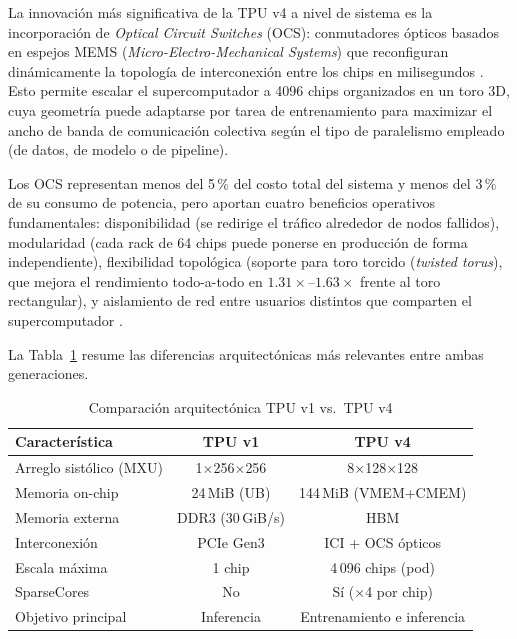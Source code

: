 \documentclass[conference]{IEEEtran}
\begin{document}
La innovación más significativa de la TPU v4 a nivel de sistema es la incorporación de \textit{Optical Circuit Switches} (OCS): conmutadores ópticos basados en espejos MEMS (\textit{Micro-Electro-Mechanical Systems}) que reconfiguran dinámicamente la topología de interconexión entre los chips en milisegundos \cite{jouppi2023tpuv4}. Esto permite escalar el supercomputador a 4096 chips organizados en un toro 3D, cuya geometría puede adaptarse por tarea de entrenamiento para maximizar el ancho de banda
de comunicación colectiva según el tipo de paralelismo empleado (de datos, de modelo o de pipeline).

Los OCS representan menos del 5\,\% del costo total del sistema y menos del 3\,\% de su consumo de potencia, pero aportan cuatro beneficios operativos fundamentales: disponibilidad (se redirige el tráfico alrededor de nodos fallidos), modularidad (cada rack de 64 chips puede ponerse en producción de forma independiente), flexibilidad topológica (soporte para toro torcido (\textit{twisted torus}), que mejora el rendimiento todo-a-todo en $1.31\times$--$1.63\times$ frente al toro rectangular), y aislamiento de red entre usuarios distintos que comparten el supercomputador \cite{jouppi2023tpuv4}.


La Tabla~\ref{tab:tpu_comparison} resume las diferencias arquitectónicas más relevantes entre ambas generaciones.
 
\begin{table}[H]
    \caption{Comparación arquitectónica TPU v1 vs.\ TPU v4}
    \centering
    \begin{tabular}{lcc}
        \toprule
        \textbf{Característica}   & \textbf{TPU v1}      & \textbf{TPU v4}          \\
        \midrule
        Arreglo sistólico (MXU)   & 1$\times$256$\times$256 & 8$\times$128$\times$128 \\
        Memoria on-chip           & 24\,MiB (UB)         & 144\,MiB (VMEM+CMEM)    \\
        Memoria externa           & DDR3 (30\,GiB/s)     & HBM                     \\
        Interconexión             & PCIe Gen3            & ICI + OCS ópticos       \\
        Escala máxima             & 1 chip               & 4\,096 chips (pod)      \\
        SparseCores               & No                   & Sí ($\times$4 por chip) \\
        Objetivo principal        & Inferencia           & Entrenamiento e inferencia \\
        \bottomrule
    \end{tabular}
\label{tab:tpu_comparison}
\end{table}
\end{document}
